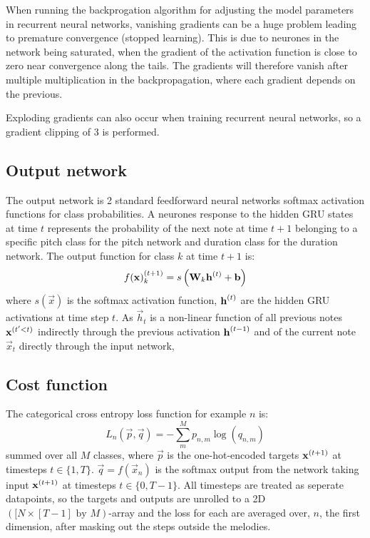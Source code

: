 	When running the backprogation algorithm for adjusting the model parameters in recurrent neural networks, vanishing gradients can be a huge problem leading to premature convergence (stopped learning). This is due to neurones in the network being saturated, when the gradient of the activation function is close to zero near convergence along the tails. The gradients will therefore vanish after multiple multiplication in the backpropagation, where each gradient depends on the previous. 

	Exploding gradients can also occur when training recurrent neural networks, so a gradient clipping of 3 is performed.  

\subsection{Output network} %
\label{sub:output_network}
	The output network is 2 standard feedforward neural networks softmax activation functions for class probabilities. A neurones response to the hidden GRU states at time $t$ represents the probability of the next note at time $t+1$ belonging to a specific pitch class for the pitch network and duration class for the duration network.   
	The output function for class $k$ at time $t+1$ is:
	\begin{equation}
		f(\vec{x})\order{t+1}_k = s\left(\mat{W}_k \vec{h}\order{t} + \vec{b}\right)%
	\end{equation}
	where $s(\vec{x})$ is the softmax activation function, $\bm{\mathrm{h}}^{(t)}$ are the hidden GRU activations at time step $t$. As $\vec{h}_t$ is a non-linear function of all previous notes $\bm{\mathrm{x}}^{(t'<t)}$ indirectly through the previous activation $\bm{\mathrm{h}}^{(t-1)}$ and of the current note $\vec{x}_t$ directly through the input network,    
	
	\subsection{Cost function} 
	The categorical cross entropy loss function for example $n$ is:
	\begin{equation}
		L_n(\vec{p}, \vec{q}) = -\sum^{M}_{m} p_{n,m} \log (q_{n,m})
	\end{equation}
	summed over all $M$ classes, where $\vec{p}$ is the one-hot-encoded targets $\bm{\mathrm{x}}^{(t+1)}$ at timesteps $t\in\{1, T\}$. $\vec{q}=f(\vec{x}_n)$ is the softmax output from the network taking input $\bm{\mathrm{x}}^{(t+1)}$ at timesteps $t\in\{0, T-1\}$. All timesteps are treated as seperate datapoints, so the targets and outputs are unrolled to a 2D $([N \times [T-1] \text{ by } M)$-array and the loss for each are averaged over, $n$, the first dimension, after masking out the steps outside the melodies.

